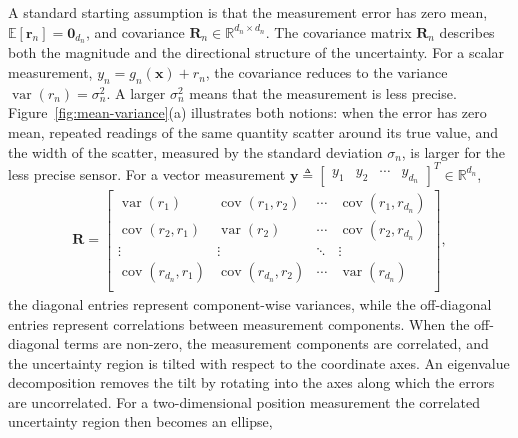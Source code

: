 A standard starting assumption is that the measurement error has zero mean, $\mathbb{E}[\mathbf{r}_n]=\mathbf{0}_{d_n}$, and covariance $\mathbf{R}_n\in\mathbb{R}^{d_n\times d_n}$. The covariance matrix $\mathbf{R}_n$ describes both the magnitude and the directional structure of the uncertainty. For a scalar measurement, $y_n=g_n(\mathbf{x})+r_n$, the covariance reduces to the variance $\operatorname{var}(r_n)=\sigma_n^2$. A larger $\sigma_n^2$ means that the measurement is less precise. Figure~\ref{fig:mean-variance}(a) illustrates both notions: when the error has zero mean, repeated readings of the same quantity scatter around its true value, and the width of the scatter, measured by the standard deviation $\sigma_n$, is larger for the less precise sensor. For a vector measurement $\mathbf{y}\triangleq \begin{bmatrix} y_{1} & y_{2} & \cdots & y_{d_n} \end{bmatrix}^T \in \mathbb{R}^{d_n}$,
\begin{align*}
\mathbf{R}=
\begin{bmatrix}
\operatorname{var}(r_{1}) & \operatorname{cov}(r_{1},r_{2}) & \cdots & \operatorname{cov}(r_{1},r_{d_n})\\
\operatorname{cov}(r_{2},r_{1}) & \operatorname{var}(r_{2}) & \cdots & \operatorname{cov}(r_{2},r_{d_n}) \\
\vdots & \vdots & \ddots & \vdots\\
\operatorname{cov}(r_{d_n},r_{1})  & \operatorname{cov}(r_{d_n},r_{2}) & \cdots & \operatorname{var}(r_{d_n}) \\
\end{bmatrix},
\end{align*}
the diagonal entries represent component-wise variances, while the off-diagonal entries represent correlations between measurement components. When the off-diagonal terms are non-zero, the measurement components are correlated, and the uncertainty region is tilted with respect to the coordinate axes. An eigenvalue decomposition removes the tilt by rotating into the axes along which the errors are uncorrelated. For a two-dimensional position measurement
the correlated uncertainty region then becomes an ellipse,
